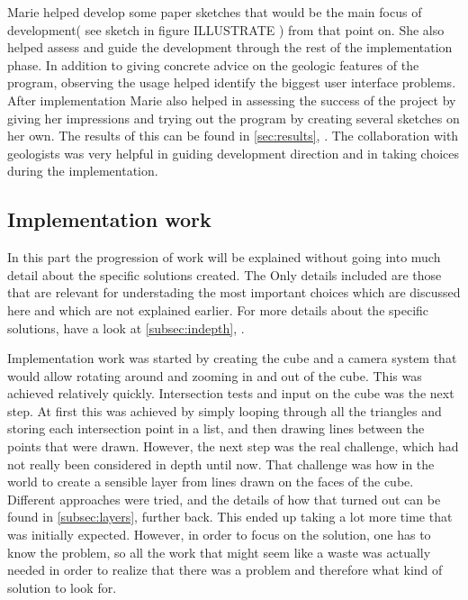 \documentclass[a4paper,12pt]{report}
\newcommand{\secref}[1]{\autoref{#1}, \nameref{#1}}
\begin{document}

Marie helped develop some paper sketches that would be the main focus of development( see sketch in figure ILLUSTRATE ) from that point on. She also helped assess and guide the development through the rest of the implementation phase. In addition to giving concrete advice on the geologic features of the program, observing the usage helped identify the biggest user interface problems. After implementation Marie also helped in assessing the success of the project by giving her impressions and trying out the program by creating several sketches on her own. The results of this can be found in \secref{sec:results}. The collaboration with geologists was very helpful in guiding development direction and in taking choices during the implementation.

\subsection{Implementation work}

In this part the progression of work will be explained without going into much detail about the specific solutions created. The Only details included are those that are relevant for understading the most important choices which are discussed here and which are not explained earlier. For more details about the specific solutions, have a look at \secref{subsec:indepth}.

Implementation work was started by creating the cube and a camera system that would allow rotating around and zooming in and out of the cube. This was achieved relatively quickly. Intersection tests and input on the cube was the next step. At first this was achieved by simply looping through all the triangles and storing each intersection point in a list, and then drawing lines between the points that were drawn. However, the next step was the real challenge, which had not really been considered in depth until now. That challenge was how in the world to create a sensible layer from lines drawn on the faces of the cube. Different approaches were tried, and the details of how that turned out can be found in \secref{subsec:layers} further back. This ended up taking a lot more time that was initially expected. However, in order to focus on the solution, one has to know the problem, so all the work that might seem like a waste was actually needed in order to realize that there was a problem and therefore what 
kind of solution to look for.
\end{document}
